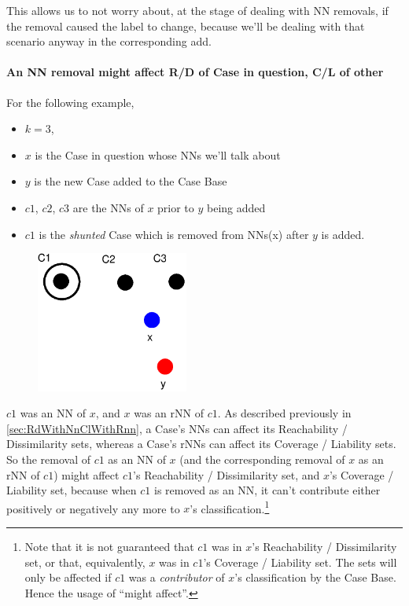 \documentclass[a4paper,11pt]{report}
\begin{document}
This allows us to not worry about, at the stage of dealing with NN removals, if the removal caused the label to change, because we'll be dealing with that scenario anyway in the corresponding add.

\paragraph{An NN removal might affect R/D of Case in question, C/L of other}

For the following example,
\begin{itemize}
	\item $k=3$, 
	\item $x$ is the Case in question whose NNs  we'll talk about
	\item $y$ is the new Case added to the Case Base
	\item $c1$, $c2$, $c3$ are the NNs of $x$ prior to $y$ being added
	\item $c1$ is the \emph{shunted} Case which is removed from NNs(x) after $y$ is added.
\end{itemize}

\begin{figure}[h!] \centering
\includegraphics[width=5cm]{./Drawn/NnMightAffectEg}
\end{figure}

$c1$ was an NN of $x$, and $x$ was an rNN of $c1$. As described previously in \ref{sec:RdWithNnClWithRnn}, a Case's NNs can affect its Reachability / Dissimilarity sets, whereas a Case's rNNs can affect its Coverage / Liability sets. So the removal of $c1$ as an NN of $x$ (and the corresponding removal of $x$ as an rNN of $c1$) might affect $c1$'s Reachability / Dissimilarity set, and $x$'s Coverage / Liability set, because when $c1$ is removed as an NN, it can't contribute either positively or negatively any more to $x$'s classification.\footnote{Note that it is not guaranteed that $c1$ was in $x$'s Reachability / Dissimilarity set, or that, equivalently, $x$ was in $c1$'s Coverage / Liability set. The sets will only be affected if $c1$ was a \emph{contributor} of $x$'s classification by the Case Base. Hence the usage of ``might affect''.}
\end{document}
